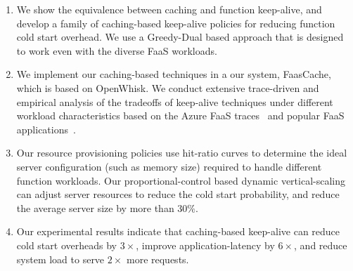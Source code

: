 \begin{enumerate}
\item We show the equivalence between caching and function keep-alive, and develop a family of caching-based keep-alive policies for reducing  function cold start overhead. We use a Greedy-Dual based approach that is designed to work even with the diverse FaaS workloads. 

\item We implement our caching-based techniques in a our system, FaasCache, which is based on OpenWhisk. 
  We conduct extensive trace-driven and empirical analysis of the tradeoffs of keep-alive techniques under different workload characteristics based on the Azure FaaS traces~\cite{shahrad_serverless_2020} and popular FaaS applications~\cite{kim_functionbench_2019}.
  
 
\item Our resource provisioning policies use hit-ratio curves to determine the ideal server configuration (such as memory size) required to handle different function workloads.
  Our proportional-control based dynamic vertical-scaling  can adjust server resources to reduce the cold start probability, and reduce the average server size by more than $30\%$. 

\item   Our experimental results indicate that caching-based keep-alive can reduce cold start overheads by $3\times$,
  improve application-latency by $6\times$,
  and reduce system load to serve $2\times$ more requests.
\end{enumerate}

%
%








